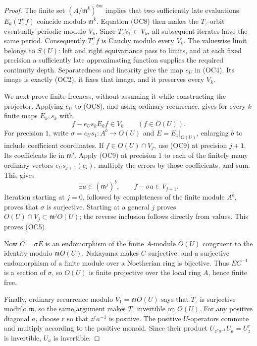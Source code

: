 \begin{proof}
The finite set \((A/\mathfrak m^k)^{bm}\) implies that two sufficiently
late evaluations \(E_k(T_z^af)\) coincide modulo \(\mathfrak m^k\).
Equation (OC8) then makes the \(T_z\)-orbit eventually periodic
modulo \(V_k\).  Since \(T_zV_k\subset V_k\), all subsequent iterates
have the same period.  Consequently \(T_z^{r!}f\) is Cauchy modulo
every \(V_k\).
The valuewise limit belongs to \(S(U)\): left and right equivariance
pass to limits, and at each fixed precision a sufficiently late
approximating function supplies the required continuity depth.
Separatedness and linearity give the map \(e_U\) in (OC4).
Its image is exactly (OC2), it fixes that image, and it preserves
every \(V_k\).

We next prove finite freeness, without assuming it while constructing
the projector.  Applying \(e_U\) to (OC8), and using ordinary
recurrence, gives for every \(k\) finite maps \(E_k,s_k\) with
\[
 f-e_Us_kE_kf\in V_k\qquad(f\in O(U)).
 \tag{OC9}
\]
For precision \(1\), write
\(\sigma=e_Us_1:A^b\to O(U)\) and
\(E=E_1|_{O(U)}\), enlarging \(b\) to include coefficient coordinates.
If \(f\in O(U)\cap V_j\), use (OC9) at precision \(j+1\).
Its coefficients lie in \(\mathfrak m^j\).
Apply (OC9) at precision \(1\) to each of the finitely many ordinary
vectors \(e_Us_{j+1}(e_i)\), multiply the errors by those coefficients,
and sum.  This gives
\[
 \exists a\in(\mathfrak m^j)^b,\qquad
 f-\sigma a\in V_{j+1}.
 \tag{OC10}
\]
Iteration starting at \(j=0\), followed by completeness of the finite
module \(A^b\), proves that \(\sigma\) is surjective.
Starting at a general \(j\) proves
\(O(U)\cap V_j\subset\mathfrak m^jO(U)\); the reverse inclusion follows
directly from values.  This proves (OC5).

Now \(C=\sigma E\) is an endomorphism of the finite \(A\)-module
\(O(U)\) congruent to the identity modulo \(\mathfrak mO(U)\).
Nakayama makes \(C\) surjective, and a surjective endomorphism of a
finite module over a Noetherian ring is bijective.
Thus \(EC^{-1}\) is a section of \(\sigma\), so \(O(U)\) is finite
projective over the local ring \(A\), hence finite free.

Finally, ordinary recurrence modulo \(V_1=\mathfrak mO(U)\) says that
\(T_z\) is surjective modulo \(\mathfrak m\), so the same argument makes
\(T_z\) invertible on \(O(U)\).
For any positive diagonal \(a\), choose \(r\) so that \(z^ra^{-1}\)
is positive.  The positive \(U\)-operators commute and multiply
according to the positive monoid.  Since their product
\(U_{z^ra^{-1}}U_a=U_z^r\) is invertible, \(U_a\) is invertible.
\end{proof}

